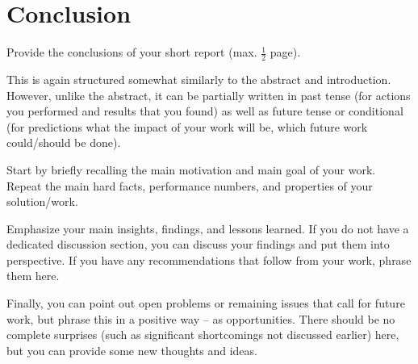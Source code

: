 \documentclass[11pt,
  titlepage=false,
]{scrreprt}
\begin{document}

\chapter{Conclusion}
\label{chap:conclusion}

Provide the conclusions of your short report (max. $\frac{1}{2}$ page).

This is again structured somewhat similarly to the abstract and introduction.
However, unlike the abstract, it can be partially written in past tense (for actions you performed and results that you found) as well as future tense or conditional (for predictions what the impact of your work will be, which future work could/should be done).

Start by briefly recalling the main motivation and main goal of your work.
Repeat the main hard facts, performance numbers, and properties of your solution/work.

Emphasize your main insights, findings, and lessons learned.
If you do not have a dedicated discussion section, you can discuss your findings and put them into perspective.
If you have any recommendations that follow from your work, phrase them here.

Finally, you can point out open problems or remaining issues that call for future work, but phrase this in a positive way -- as opportunities.
There should be no complete surprises (such as significant shortcomings not discussed earlier) here, but you can provide some new thoughts and ideas.



\printbibliography
\end{document}
